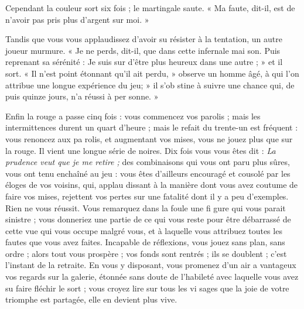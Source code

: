 Cependant la couleur sort six fois ;
le martingale saute. « Ma faute,
dit-il, est de n'avoir pas pris plus
d'argent sur moi. »

Tandis que vous vous applaudissez
d'avoir su résister à la tentation, un
autre joueur murmure. « Je ne perds,
dit-il, que dans cette infernale mai%
son. Puis reprenant sa sérénité :
Je suis sur d'être plus heureux dans
une autre ; » et il sort. « Il n'est point
étonnant qu'il ait perdu, » observe
un homme âgé, à qui l'on attribue une
longue expérience du jeu; » il s'ob%
stine à suivre une chance qui, de%
puis quinze jours, n'a réussi à per%
sonne. »

Enfin la rouge a passe cinq fois :
vous commencez vos parolis ; mais
les intermittences durent un quart%
d'heure ; mais le refait du trente-un
est fréquent : vous renoncez aux pa%
rolis, et augmentant vos mises, vous
ne jouez plus que sur la rouge. Il vient
une longue série de noires. Dix fois
vous vous êtes dit : \emph{La prudence veut
que je me retire ;} des combinaisons
qui vous ont paru plus sûres, vous
ont tenu enchaîné au jeu : vous êtes
d'ailleurs encouragé et cousolé par
les éloges de vos voisins, qui, applau%
dissant à la manière dont vous avez
coutume de faire vos mises, rejettent
vos pertes sur une fatalité dont il y a
peu d'exemples. Rien ne vous réussit.
Vous remarquez dans la foule une fi%
gure qui vous parait sinistre ; vous
donneriez une partie de ce qui vous
reste pour être débarrassé de cette
vue qui vous occupe malgré vous, et
à laquelle vous attribuez toutes les
fautes que vous avez faites. Incapable
de réflexions, vous jouez sans plan,
sans ordre ; alors tout vous prospère ;
vos fonds sont rentrés ; ils se doublent ;
c'est l'instant de la retraite. En vous y
disposant, vous promenez d'un air a%
vantageux vos regards sur la galerie,
étonnée sans doute de l'habileté avec
laquelle vous avez su faire fléchir le
sort ; vous croyez lire sur tous les vi%
sages que la joie de votre triomphe
est partagée, elle en devient plus
vive.

